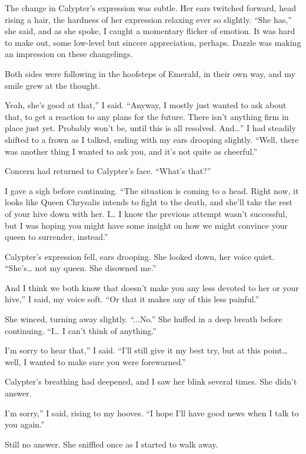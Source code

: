 The change in Calypter’s expression was subtle. Her ears twitched forward, head rising a hair, the hardness of her expression relaxing ever so slightly. “She has,” she said, and as she spoke, I caught a momentary flicker of emotion. It was hard to make out, some low-level but sincere appreciation, perhaps. Dazzle was making an impression on these changelings.

Both sides were following in the hoofsteps of Emerald, in their own way, and my smile grew at the thought.

\leavevmode{}Yeah, she’s good at that,” I said. “Anyway, I mostly just wanted to ask about that, to get a reaction to any plans for the future. There isn’t anything firm in place just yet. Probably won’t be, until this is all resolved. And…” I had steadily shifted to a frown as I talked, ending with my ears drooping slightly. “Well, there was another thing I wanted to ask you, and it’s not quite as cheerful.”

Concern had returned to Calypter’s face. “What’s that?”

I gave a sigh before continuing. “The situation is coming to a head. Right now, it looks like Queen Chrysalis intends to fight to the death, and she’ll take the rest of your hive down with her. I… I know the previous attempt wasn’t successful, but I was hoping you might have some insight on how we might convince your queen to surrender, instead.”

Calypter’s expression fell, ears drooping. She looked down, her voice quiet. “She’s… not my queen. She disowned me.”

\leavevmode{}And I think we both know that doesn’t make you any less devoted to her or your hive,” I said, my voice soft. “Or that it makes any of this less painful.”

She winced, turning away slightly. “...No.” She huffed in a deep breath before continuing. “I… I can’t think of anything.”

\leavevmode{}I’m sorry to hear that,” I said. “I’ll still give it my best try, but at this point… well, I wanted to make sure you were forewarned.”

Calypter’s breathing had deepened, and I saw her blink several times. She didn’t answer.

\leavevmode{}I’m sorry,” I said, rising to my hooves. “I hope I’ll have good news when I talk to you again.”

Still no answer. She sniffled once as I started to walk away.

